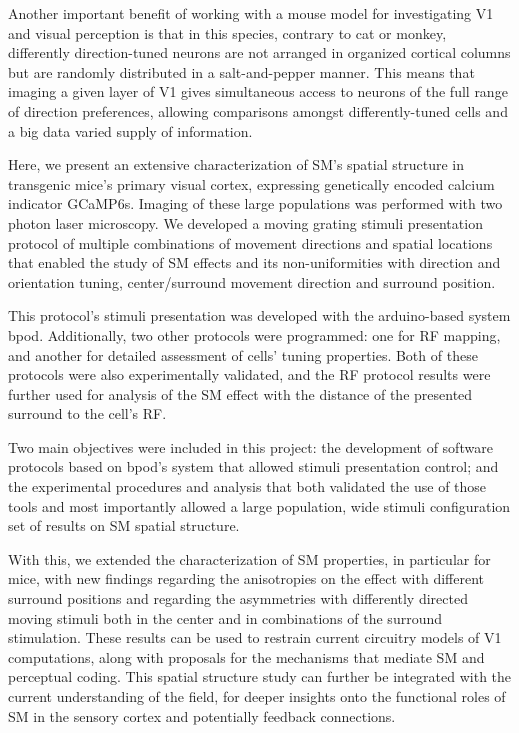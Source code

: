 Another important benefit of working with a mouse model for investigating V1 and visual perception is that in this species, contrary to cat or monkey, differently direction-tuned neurons are not arranged in organized cortical columns but are randomly distributed in a salt-and-pepper manner. This means that imaging a given layer of V1 gives simultaneous access to neurons of the full range of direction preferences, allowing comparisons amongst differently-tuned cells and a big data varied supply of information.

Here, we present an extensive characterization of SM's spatial structure in transgenic mice's primary visual cortex, expressing genetically encoded calcium indicator GCaMP6s. Imaging of these large populations was performed with two photon laser microscopy. We developed a moving grating stimuli presentation protocol of multiple combinations of movement directions and spatial locations that enabled the study of SM effects and its non-uniformities with direction and orientation tuning, center/surround movement direction and surround position. 

This protocol's stimuli presentation was developed with the arduino-based system bpod. Additionally, two other protocols were programmed: one for RF mapping, and another for detailed assessment of cells' tuning properties. Both of these protocols were also experimentally validated, and the RF protocol results were further used for analysis of the SM effect with the distance of the presented surround to the cell's RF.

Two main objectives were included in this project: the development of software protocols based on bpod's system that allowed stimuli presentation control; and the experimental procedures and analysis that both validated the use of those tools and most importantly allowed a large population, wide stimuli configuration set of results on SM spatial structure.

With this, we extended the characterization of SM properties, in particular for mice, with new findings regarding the anisotropies on the effect with different surround positions and regarding the asymmetries with differently directed moving stimuli both in the center and in combinations of the surround stimulation. These results can be used to restrain current circuitry models of V1 computations, along with proposals for the mechanisms that mediate SM and perceptual coding. This spatial structure study can further be integrated with the current understanding of the field, for deeper insights onto the functional roles of SM in the sensory cortex and potentially feedback connections.

